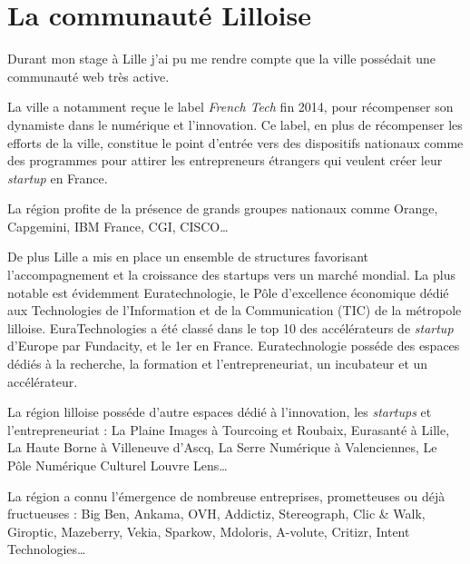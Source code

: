 \documentclass[12pt,a4paper]{article}
\begin{document}
  \newpage

  \section{La communauté Lilloise}\label{la-communautuxe9-lilloise}

  Durant mon stage à Lille j'ai pu me rendre compte que la ville possédait
  une communauté web très active.

  \bigskip

  La ville a notamment reçue le label \emph{French Tech} fin 2014, pour
  récompenser son dynamiste dans le numérique et l'innovation. Ce label,
  en plus de récompenser les efforts de la ville, constitue le point
  d'entrée vers des dispositifs nationaux comme des programmes pour
  attirer les entrepreneurs étrangers qui veulent créer leur
  \emph{startup} en France.

  \bigskip

  La région profite de la présence de grands groupes nationaux comme
  Orange, Capgemini, IBM France, CGI, CISCO\ldots{}

  \bigskip

  De plus Lille a mis en place un ensemble de structures favorisant
  l'accompagnement et la croissance des startups vers un marché mondial.
  La plus notable est évidemment Euratechnologie, le Pôle d'excellence
  économique dédié aux Technologies de l'Information et de la
  Communication (TIC) de la métropole lilloise. EuraTechnologies a été
  classé dans le top 10 des accélérateurs de \emph{startup} d'Europe par
  Fundacity, et le 1er en France. Euratechnologie posséde des espaces
  dédiés à la recherche, la formation et l'entrepreneuriat, un incubateur
  et un accélérateur.

  \bigskip

  La région lilloise posséde d'autre espaces dédié à l'innovation, les
  \emph{startups} et l'entrepreneuriat : La Plaine Images à Tourcoing et
  Roubaix, Eurasanté à Lille, La Haute Borne à Villeneuve d'Ascq, La Serre
  Numérique à Valenciennes, Le Pôle Numérique Culturel Louvre Lens\ldots{}

  \bigskip

  La région a connu l'émergence de nombreuse entreprises, prometteuses ou
  déjà fructueuses : Big Ben, Ankama, OVH, Addictiz, Stereograph, Clic \&
  Walk, Giroptic, Mazeberry, Vekia, Sparkow, Mdoloris, A-volute, Critizr,
  Intent Technologies\ldots{}

  \bigskip
\end{document}
